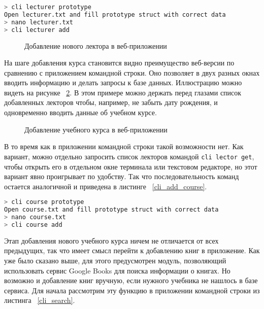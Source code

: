 \begin{lstlisting}[language=bash, caption = {Добавление лектора}, captionpos=b, label={cli_add_lecturer}]
> cli lecturer prototype
Open lecturer.txt and fill prototype struct with correct data
> nano lecturer.txt 
> cli lecturer add
\end{lstlisting}

\begin{figure}[h!]
	\caption{Добавление нового лектора в веб-приложении}
	\label{web_add_lecturer}
\end{figure}

На шаге добавления курса становится видно преимущество веб-версии по сравнению с приложением командной строки.
Оно позволяет в двух разных окнах вводить информацию и делать запросы к базе данных. Иллюстрацию можно видеть
на рисунке ~\ref{web_add_course}. В этом примере можно держать перед глазами список добавленных лекторов чтобы,
например, не забыть дату рождения, и одновременно вводить данные об учебном курсе.

\begin{figure}[h!]
	\caption{Добавление учебного курса в веб-приложении}
	\label{web_add_course}
\end{figure}

В то время как в приложении командной строки такой возможности нет. Как вариант, можно отдельно запросить список
лекторов командой \texttt{cli lector get}, чтобы открыть его в отдельном окне терминала или текстовом редакторе, но этот вариант 
явно проигрывает по удобству. Так что последовательность команд остается аналогичной и приведена в листинге ~\ref{cli_add_course}.

\begin{lstlisting}[language=bash, caption = {Добавление лектора}, captionpos=b, label={cli_add_course}]
> cli course prototype
Open course.txt and fill prototype struct with correct data
> nano course.txt 
> cli course add
\end{lstlisting}

Этап добавления нового учебного курса ничем не отличается от всех предыдущих, так что имеет смысл перейти к добавлению книг в приложение.
Как уже было сказано выше, для этого предусмотрен модуль, позволяющий использовать сервис Google Books для поиска информации о
книгах. Но возможно и добавление книг вручную, если нужного учебника не нашлось в базе сервиса. 
Для начала рассмотрим эту функцию в приложении командной строки из листинга ~\ref{cli_search}.

